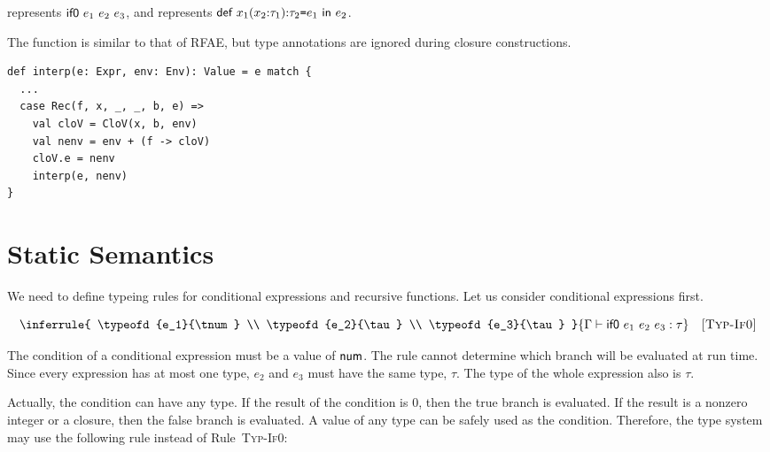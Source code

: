  represents $\textsf{if0}\ e_1\ e_2\ e_3$, and
 represents
$\textsf{def}\ x_1(x_2{:}\tau_1){:}\tau_2\texttt{=} e_1\ \textsf{in}\ e_2$.

The  function is similar to that of \textsf{RFAE}, but type
annotations are ignored during closure constructions.

\begin{verbatim}
def interp(e: Expr, env: Env): Value = e match {
  ...
  case Rec(f, x, _, _, b, e) =>
    val cloV = CloV(x, b, env)
    val nenv = env + (f -> cloV)
    cloV.e = nenv
    interp(e, nenv)
}
\end{verbatim}

\section{Static Semantics}

We need to define typeing rules for conditional expressions and recursive
functions. Let us consider conditional expressions first.


\vspace{-1em}

\[
  \inferrule
  { \typeofd{e_1}{\tnum} \\
    \typeofd{e_2}{\tau} \\
    \typeofd{e_3}{\tau} }
  { \typeofd{\eifz{e_1}{e_2}{e_3}}{\tau} }
  \quad\textsc{[Typ-If0]}
\]

The condition of a conditional expression must be a value of $\textsf{num}$.
The rule cannot determine which branch will be evaluated at run time.
Since every expression has at most one type, $e_2$ and $e_3$ must have the same
type, $\tau$. The type of the whole expression also is $\tau$.

Actually, the condition can have any type. If the result of
the condition is $0$, then the true branch is evaluated. If the result is a
nonzero integer or a closure, then the false branch is evaluated.
A value of any type can be safely used as the condition.
Therefore, the type system may use the following rule instead of
Rule~\textsc{Typ-If0}:

